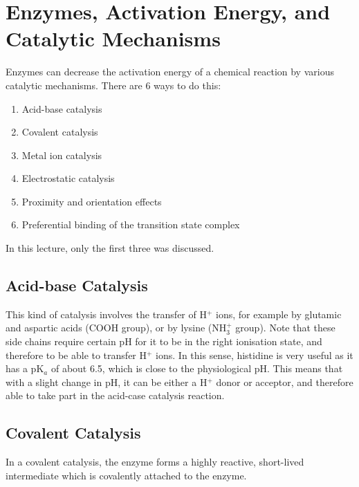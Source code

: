 \section{Enzymes, Activation Energy, and \\Catalytic Mechanisms}

\begin{center}
\end{center}

Enzymes can decrease the activation energy of a chemical reaction by various catalytic mechanisms.
There are 6 ways to do this:

\begin{enumerate}
\item Acid-base catalysis
\item Covalent catalysis
\item Metal ion catalysis
\item Electrostatic catalysis
\item Proximity and orientation effects
\item Preferential binding of the transition state complex
\end{enumerate}

In this lecture, only the first three was discussed.

\subsection{Acid-base Catalysis}

This kind of catalysis involves the transfer of H$^+$ ions, for example by glutamic and aspartic acids (COOH group), or by lysine (NH$_3^+$ group).
Note that these side chains require certain pH for it to be in the right ionisation state, and therefore to be able to transfer H$^+$ ions.
In this sense, histidine is very useful as it has a pK$_a$ of about 6.5, which is close to the physiological pH.
This means that with a slight change in pH, it can be either a H$^+$ donor or acceptor, and therefore able to take part in the acid-case catalysis reaction.

\subsection{Covalent Catalysis}

In a covalent catalysis, the enzyme forms a highly reactive, short-lived intermediate which is covalently attached to the enzyme.

